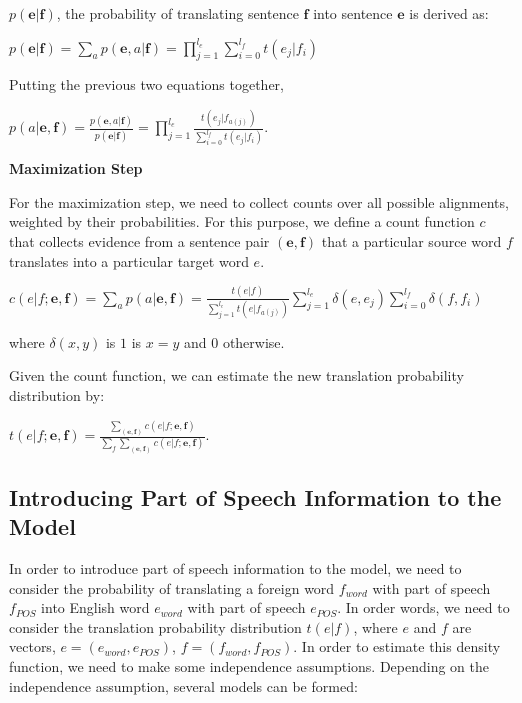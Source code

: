 \documentclass[11pt]{report}
\theoremstyle{plain}
\begin{document}
{$p(\textbf{e}|\textbf{f})$, the probability of translating sentence
$\textbf{f}$ into sentence $\textbf{e}$ is derived as:

\begin{center}

$p(\textbf{e}|\textbf{f}) = \sum_a p(\textbf{e},a|\textbf{f}) =
\prod_{j=1}^{l_e} \sum_{i=0}^{l_f}t(e_j|f_i)$
\end{center}

Putting the previous two equations together,

\begin{center}

 $p(a|\textbf{e},\textbf{f}) =
\frac{p(\textbf{e},a|\textbf{f})}{p(\textbf{e}|\textbf{f})}
=\prod_{j=1}^{l_e} \frac {t(e_j | f_{a(j)})}{\sum_{i=0}^{l_f}
t(e_j|f_i)}$.


\end{center}

\textbf{Maximization Step}

For the maximization step, we need to collect counts over all
possible alignments, weighted by their probabilities. For this
purpose, we define a count function $c$ that collects evidence from
a sentence pair $(\textbf{e},\textbf{f})$ that a particular source
word $f$  translates into a particular target word $e$.

\begin{center}

$c(e|f;\textbf{e},\textbf{f}) = \sum_a p(a|\textbf{e},\textbf{f}) =
\frac{t(e|f)}{\sum_{j=1}^{l_e}t(e|f_{a(j)})} \sum_{j=1}^{l_e}
\delta(e,e_j)\sum_{i=0}^{l_f}\delta(f,f_i)$

\end{center}

where $\delta(x,y)$ is $1$ is $x=y$ and $0$ otherwise.

Given the count function, we can estimate the new translation
probability distribution by:

\begin{center}
$t(e|f;\textbf{e},\textbf{f}) =
\frac{\sum_{(\textbf{e},\textbf{f})}c(e|f;\textbf{e},\textbf{f})}{\sum_f\sum_{(\textbf{e},\textbf{f})}c(e|f;\textbf{e},\textbf{f})}$.
\end{center}


\subsection{Introducing Part of Speech Information to the Model}
In order to introduce part of speech information to the model, we
need to consider the probability of translating a foreign word
$f_{word}$ with part of speech $f_{POS}$ into English word
$e_{word}$ with part of speech $e_{POS}$. In order words, we need to
consider the translation probability distribution $t(e|f)$, where
$e$ and $f$ are vectors, $e = (e_{word},e_{POS})$, $f = (f_{word},
f_{POS})$. In order to estimate this density function, we need to
make some independence assumptions. Depending on the independence
assumption, several models can be formed:

}
\end{document}
